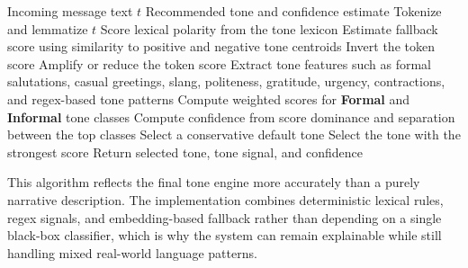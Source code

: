 \begin{algorithm}[H]
\caption{Tone Preference Detection and Selection}
\label{alg:tone_preference}
\begin{algorithmic}[1]
\Require Incoming message text $t$
\Ensure Recommended tone and confidence estimate
\State Tokenize and lemmatize $t$
    \State Score lexical polarity from the tone lexicon
        \State Estimate fallback score using similarity to positive and negative tone centroids
    \EndIf
        \State Invert the token score
    \EndIf
        \State Amplify or reduce the token score
    \EndIf
\EndFor
\State Extract tone features such as formal salutations, casual greetings, slang, politeness, gratitude, urgency, contractions, and regex-based tone patterns
\State Compute weighted scores for \textbf{Formal} and \textbf{Informal} tone classes
\State Compute confidence from score dominance and separation between the top classes
    \State Select a conservative default tone
\Else
    \State Select the tone with the strongest score
\EndIf
\State Return selected tone, tone signal, and confidence
\end{algorithmic}
\end{algorithm}

This algorithm reflects the final tone engine more accurately than a purely narrative description. The implementation combines deterministic lexical rules, regex signals, and embedding-based fallback rather than depending on a single black-box classifier, which is why the system can remain explainable while still handling mixed real-world language patterns.
